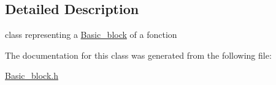 \subsection{Detailed Description}
class representing a \hyperlink{class_basic__block}{Basic\-\_\-block} of a fonction 

The documentation for this class was generated from the following file\-:\begin{DoxyCompactItemize}
\item 
\hyperlink{_basic__block_8h}{Basic\-\_\-block.\-h}\end{DoxyCompactItemize}
